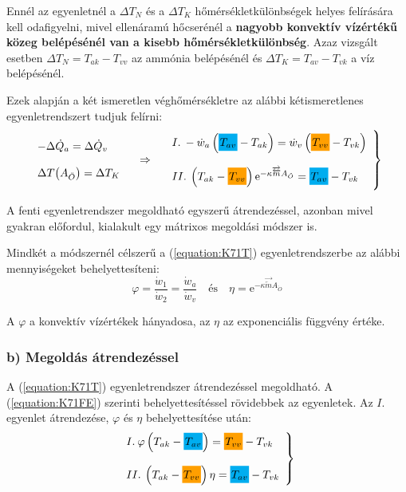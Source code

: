 Ennél az egyenletnél a $\Delta T_N$ és a $\Delta T_K$ hőmérsékletkülönbségek helyes felírására kell odafigyelni, mivel ellenáramú hőcserénél a \textbf{nagyobb konvektív vízértékű közeg belépésénél van a kisebb hőmérsékletkülönbség}. Azaz vizsgált esetben $\Delta T_N = T_{ak} - T_{vv}$ az ammónia belépésénél és $\Delta T_K = T_{av} - T_{vk}$ a víz belépésénél.

Ezek alapján a két ismeretlen véghőmérsékletre az alábbi kétismeretlenes egyenletrendszert tudjuk felírni:
\begin{equation}
	\label{equation:K71T}
	\begin{array}{l}
		-\Delta \dot{Q}_a = \Delta \dot{Q}_v
		\\ \\
		\Delta T\!\left(A_{\ddot{O}}\right) = \Delta T_K
	\end{array}
	\quad \Rightarrow \quad
	\left.
	\begin{array}{l}
		I.\: -\dot{w}_a \left(\highlight{cyan}{T_{av}} - T_{ak}\right) 
		= 
		\dot{w}_v \left(\highlight{orange!75!yellow}{T_{vv}} - T_{vk}\right) 
		\\ \\
		II.\: \left(T_{ak} - \highlight{orange!75!yellow}{T_{vv}}\right) \mathrm{e}^{-\kappa \overrightarrow{\overleftarrow{m}} A_{\ddot{O}}} = \highlight{cyan}{T_{av}} - T_{vk}
	\end{array}
	\right\rbrace
\end{equation}

A fenti egyenletrendszer megoldható egyszerű átrendezéssel, azonban mivel gyakran előfordul, kialakult egy mátrixos megoldási módszer is.

Mindkét a módszernél célszerű a (\ref{equation:K71T}) egyenletrendszerbe az alábbi mennyiségeket behelyettesíteni:
\begin{equation}
	\label{equation:K71FE}
	\varphi = \dfrac{\dot{w}_1}{\dot{w}_2} = \dfrac{\dot{w}_a}{\dot{w}_v}
	\quad \textrm{és} \quad 
	\eta = \mathrm{e}^{-\kappa \overrightarrow{\overleftarrow{m}} A_{\ddot{O}}}
\end{equation}

A $\varphi$ a konvektív vízértékek hányadosa, az $\eta$ az exponenciális függvény értéke.

\subsubsection*{b) Megoldás átrendezéssel}
A (\ref{equation:K71T}) egyenletrendszer átrendezéssel megoldható. A (\ref{equation:K71FE}) szerinti behelyettesítéssel rövidebbek az egyenletek.
Az $I.$ egyenlet átrendezése, $\varphi$ és $\eta$ behelyettesítése után:
\begin{equation}
	\label{equation:K71TT}
	\left.
	\begin{array}{l}
		I.\: \varphi \left( T_{ak} - \highlight{cyan}{T_{av}} \right) 
		= 
		\highlight{orange!75!yellow}{T_{vv}} - T_{vk} 
	\\ \\
		II.\: \left(T_{ak} - \highlight{orange!75!yellow}{T_{vv}}\right) \eta = \highlight{cyan}{T_{av}} - T_{vk}
	\end{array}
\right\rbrace
\end{equation}

